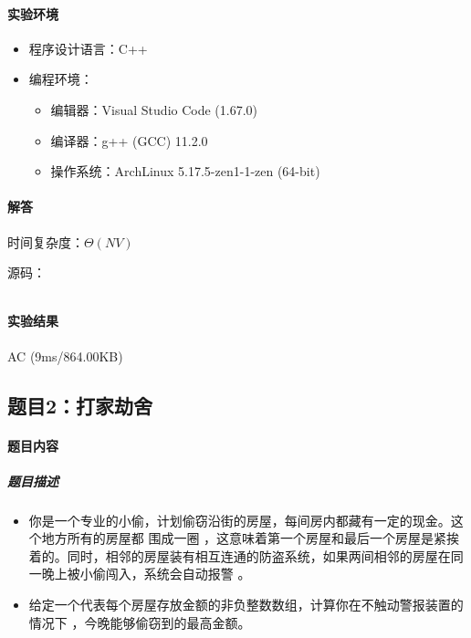 \documentclass[12pt,a4paper]{ctexart}
\begin{document}
\paragraph{实验环境}
\begin{itemize}
    \item 程序设计语言：C++
    \item 编程环境：
    \begin{itemize}
        \item 编辑器：Visual Studio Code (1.67.0)
        \item 编译器：g++ (GCC) 11.2.0
        \item 操作系统：ArchLinux 5.17.5-zen1-1-zen (64-bit)
    \end{itemize}
\end{itemize}

\vspace{5pt}

\paragraph{解答} 时间复杂度：$\Theta(NV)$

源码：
\inputminted[bgcolor=codebg,frame=lines,autogobble,linenos=true,breaklines]{cpp}{src/t2.cpp}

\vspace{5pt}

\paragraph{实验结果}AC (9ms/864.00KB)


\subsection*{题目2：打家劫舍}
\paragraph{题目内容}
\subparagraph{题目描述}
\begin{itemize}
    \item 你是一个专业的小偷，计划偷窃沿街的房屋，每间房内都藏有一定的现金。这个地方所有的房屋都 围成一圈 ，这意味着第一个房屋和最后一个房屋是紧挨着的。同时，相邻的房屋装有相互连通的防盗系统，如果两间相邻的房屋在同一晚上被小偷闯入，系统会自动报警 。
    \item 给定一个代表每个房屋存放金额的非负整数数组，计算你在不触动警报装置的情况下 ，今晚能够偷窃到的最高金额。

\end{itemize}
\end{document}
